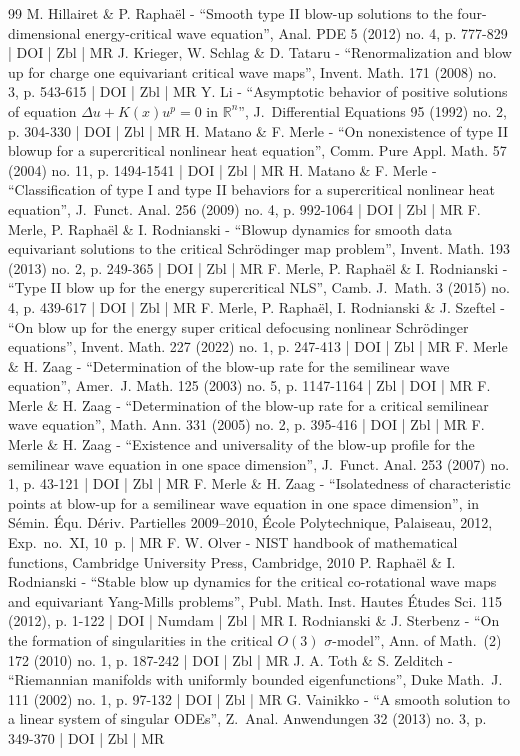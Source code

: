\begin{thebibliography}{99}
M. Hillairet \& P. Raphaël - “Smooth type II blow-up solutions to the four-dimensional energy-critical wave equation”, Anal. PDE 5 (2012) no. 4, p. 777-829 | DOI | Zbl | MR
J. Krieger, W. Schlag \& D. Tataru - “Renormalization and blow up for charge one equivariant critical wave maps”, Invent. Math. 171 (2008) no. 3, p. 543-615 | DOI | Zbl | MR
Y. Li - “Asymptotic behavior of positive solutions of equation $\Delta u+ K (x) u^p= 0$ in $\mathbb{R}^n$”, J. Differential Equations 95 (1992) no. 2, p. 304-330 | DOI | Zbl | MR
H. Matano \& F. Merle - “On nonexistence of type II blowup for a supercritical nonlinear heat equation”, Comm. Pure Appl. Math. 57 (2004) no. 11, p. 1494-1541 | DOI | Zbl | MR
H. Matano \& F. Merle - “Classification of type I and type II behaviors for a supercritical nonlinear heat equation”, J. Funct. Anal. 256 (2009) no. 4, p. 992-1064 | DOI | Zbl | MR
F. Merle, P. Raphaël \& I. Rodnianski - “Blowup dynamics for smooth data equivariant solutions to the critical Schrödinger map problem”, Invent. Math. 193 (2013) no. 2, p. 249-365 | DOI | Zbl | MR
F. Merle, P. Raphaël \& I. Rodnianski - “Type II blow up for the energy supercritical NLS”, Camb. J. Math. 3 (2015) no. 4, p. 439-617 | DOI | Zbl | MR
F. Merle, P. Raphaël, I. Rodnianski \& J. Szeftel - “On blow up for the energy super critical defocusing nonlinear Schrödinger equations”, Invent. Math. 227 (2022) no. 1, p. 247-413 | DOI | Zbl | MR
F. Merle \& H. Zaag - “Determination of the blow-up rate for the semilinear wave equation”, Amer. J. Math. 125 (2003) no. 5, p. 1147-1164 | Zbl | DOI | MR
F. Merle \& H. Zaag - “Determination of the blow-up rate for a critical semilinear wave equation”, Math. Ann. 331 (2005) no. 2, p. 395-416 | DOI | Zbl | MR
F. Merle \& H. Zaag - “Existence and universality of the blow-up profile for the semilinear wave equation in one space dimension”, J. Funct. Anal. 253 (2007) no. 1, p. 43-121 | DOI | Zbl | MR
F. Merle \& H. Zaag - “Isolatedness of characteristic points at blow-up for a semilinear wave equation in one space dimension”, in Sémin. Équ. Dériv. Partielles 2009–2010, École Polytechnique, Palaiseau, 2012, Exp. no. XI, 10 p. | MR
F. W. Olver - NIST handbook of mathematical functions, Cambridge University Press, Cambridge, 2010
P. Raphaël \& I. Rodnianski - “Stable blow up dynamics for the critical co-rotational wave maps and equivariant Yang-Mills problems”, Publ. Math. Inst. Hautes Études Sci. 115 (2012), p. 1-122 | DOI | Numdam | Zbl | MR
I. Rodnianski \& J. Sterbenz - “On the formation of singularities in the critical $O(3)$ $\sigma $-model”, Ann. of Math. (2) 172 (2010) no. 1, p. 187-242 | DOI | Zbl | MR
J. A. Toth \& S. Zelditch - “Riemannian manifolds with uniformly bounded eigenfunctions”, Duke Math. J. 111 (2002) no. 1, p. 97-132 | DOI | Zbl | MR
G. Vainikko - “A smooth solution to a linear system of singular ODEs”, Z. Anal. Anwendungen 32 (2013) no. 3, p. 349-370 | DOI | Zbl | MR
\end{thebibliography}
